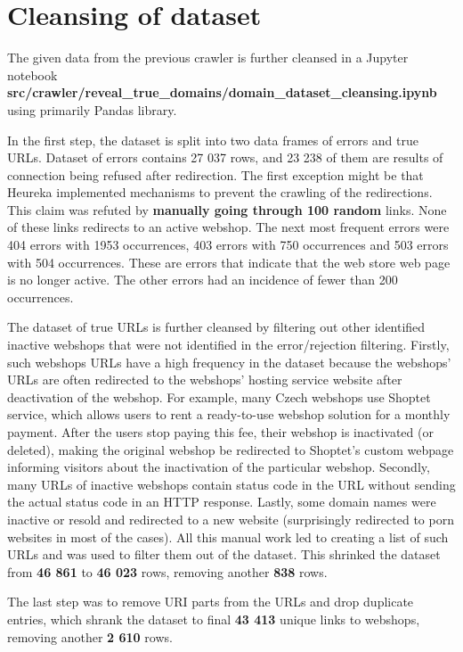 \section{Cleansing of dataset}

The given data from the previous crawler is further cleansed in a Jupyter notebook \textbf{src\string/crawler\string/reveal\_true\_domains\string/domain\_dataset\_cleansing.ipynb} using primarily Pandas library.

In the first step, the dataset is split into two data frames of errors and true URLs. Dataset of errors contains 27 037 rows, and 23 238 of them are results of connection being refused after redirection. The first exception might be that Heureka implemented mechanisms to prevent the crawling of the redirections. This claim was refuted by \textbf{manually going through 100 random} links. None of these links redirects to an active webshop. The next most frequent errors were 404 errors with 1953 occurrences, 403 errors with 750 occurrences and 503 errors with 504 occurrences. These are errors that indicate that the web store web page is no longer active. The other errors had an incidence of fewer than 200 occurrences.

The dataset of true URLs is further cleansed by filtering out other identified inactive webshops that were not identified in the error/rejection filtering. Firstly, such webshops URLs have a high frequency in the dataset because the webshops' URLs are often redirected to the webshops' hosting service website after deactivation of the webshop. For example, many Czech webshops use Shoptet service, which allows users to rent a ready-to-use webshop solution for a monthly payment. After the users stop paying this fee, their webshop is inactivated (or deleted), making the original webshop be redirected to Shoptet's custom webpage informing visitors about the inactivation of the particular webshop. Secondly, many URLs of inactive webshops contain status code in the URL without sending the actual status code in an HTTP response. Lastly, some domain names were inactive or resold and redirected to a new website (surprisingly redirected to porn websites in most of the cases). All this manual work led to creating a list of such URLs and was used to filter them out of the dataset. This shrinked the dataset from \textbf{46 861} to \textbf{46 023} rows, removing another \textbf{838} rows.

The last step was to remove URI parts from the URLs and drop duplicate entries, which shrank the dataset to final \textbf{43 413} unique links to webshops, removing another \textbf{2 610} rows.

